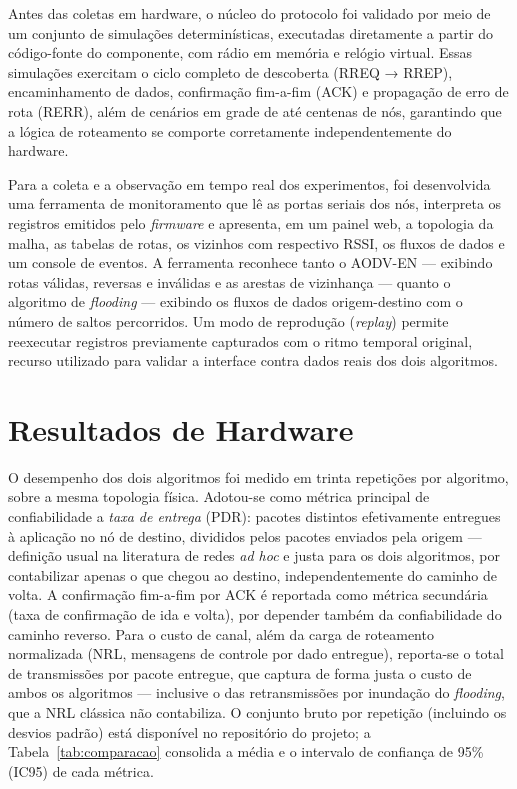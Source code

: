 Antes das coletas em hardware, o núcleo do protocolo foi validado por
meio de um conjunto de simulações determinísticas, executadas
diretamente a partir do código-fonte do componente, com rádio em memória
e relógio virtual. Essas simulações exercitam o ciclo completo de
descoberta (RREQ → RREP), encaminhamento de dados, confirmação fim-a-fim
(ACK) e propagação de erro de rota (RERR), além de cenários em grade de
até centenas de nós, garantindo que a lógica de roteamento se comporte
corretamente independentemente do hardware.

Para a coleta e a observação em tempo real dos experimentos, foi
desenvolvida uma ferramenta de monitoramento que lê as portas seriais
dos nós, interpreta os registros emitidos pelo \emph{firmware} e
apresenta, em um painel web, a topologia da malha, as tabelas de rotas,
os vizinhos com respectivo RSSI, os fluxos de dados e um console de
eventos. A ferramenta reconhece tanto o AODV-EN --- exibindo rotas
válidas, reversas e inválidas e as arestas de vizinhança --- quanto o
algoritmo de \emph{flooding} --- exibindo os fluxos de dados
origem-destino com o número de saltos percorridos. Um modo de reprodução
(\emph{replay}) permite reexecutar registros previamente capturados com
o ritmo temporal original, recurso utilizado para validar a interface
contra dados reais dos dois algoritmos.

\section{Resultados de Hardware}\label{resultados-de-hardware}

O desempenho dos dois algoritmos foi medido em trinta repetições por
algoritmo, sobre a mesma topologia física. Adotou-se como métrica
principal de confiabilidade a \emph{taxa de entrega} (PDR): pacotes
distintos efetivamente entregues à aplicação no nó de destino, divididos
pelos pacotes enviados pela origem --- definição usual na literatura de
redes \emph{ad hoc} e justa para os dois algoritmos, por contabilizar
apenas o que chegou ao destino, independentemente do caminho de volta. A
confirmação fim-a-fim por ACK é reportada como métrica secundária (taxa
de confirmação de ida e volta), por depender também da confiabilidade do
caminho reverso. Para o custo de canal, além da carga de roteamento
normalizada (NRL, mensagens de controle por dado entregue), reporta-se o
total de transmissões por pacote entregue, que captura de forma justa o
custo de ambos os algoritmos --- inclusive o das retransmissões por
inundação do \emph{flooding}, que a NRL clássica não contabiliza. O
conjunto bruto por repetição (incluindo os desvios padrão) está disponível
no repositório do projeto; a Tabela~\ref{tab:comparacao} consolida a média
e o intervalo de confiança de 95\% (IC95) de cada métrica.

